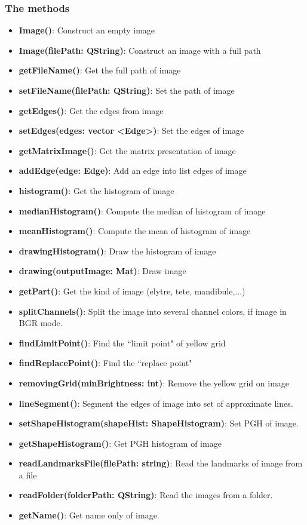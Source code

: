 \subsubsection{The methods}
\begin{itemize}
\item\textbf{Image()}: Construct an empty image
\item\textbf{Image(filePath: QString)}: Construct an image with a full path
\item\textbf{getFileName()}: Get the full path of image
\item\textbf{setFileName(filePath: QString)}: Set the path of image
\item\textbf{getEdges()}: Get the edges from image
\item\textbf{setEdges(edges: vector \textless Edge\textgreater)}: Set the edges of image
\item\textbf{getMatrixImage()}: Get the matrix presentation of image
\item\textbf{addEdge(edge: Edge)}: Add an edge into list edges of image
\item\textbf{histogram()}: Get the histogram of image
\item\textbf{medianHistogram()}: Compute the median of histogram of image
\item\textbf{meanHistogram()}: Compute the mean of histogram of image
\item\textbf{drawingHistogram()}: Draw the histogram of image
\item\textbf{drawing(outputImage: Mat)}: Draw image
\item\textbf{getPart()}: Get the kind of image (elytre, tete, mandibule,...)
\item\textbf{splitChannels()}:  Split the image into several channel colors, if image in BGR mode.
\item\textbf{findLimitPoint()}: Find the ``limit point" of yellow grid
\item\textbf{findReplacePoint()}: Find the ``replace point"
\item\textbf{removingGrid(minBrightness: int)}: Remove the yellow grid on image
\item\textbf{lineSegment()}: Segment the edges of image into set of approximate lines.
\item\textbf{setShapeHistogram(shapeHist: ShapeHistogram)}: Set PGH of image.
\item\textbf{getShapeHistogram()}: Get PGH histogram of image
\item\textbf{readLandmarksFile(filePath: string)}: Read the landmarks of image from a file
\item\textbf{readFolder(folderPath: QString)}: Read the images from a folder.
\item\textbf{getName()}: Get name only of image.
\end{itemize}
